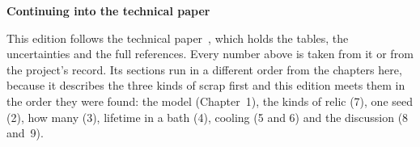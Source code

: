 \documentclass[11pt,letterpaper]{article}
\begin{document}
\par{}\vspace{1.4em}
{\color{ink}\LARGE\bfseries Continuing into the technical paper}\par
\vspace{0.6em}

This edition follows the technical paper~\cite{tech}, which holds the tables, the uncertainties and
the full references. Every number above is taken from it or from the project's record. Its sections
run in a different order from the chapters here, because it describes the three kinds of scrap first
and this edition meets them in the order they were found: the model (Chapter~1), the kinds of relic
(7), one seed (2), how many (3), lifetime in a bath (4), cooling (5 and 6) and the discussion (8
and~9).
\end{document}

